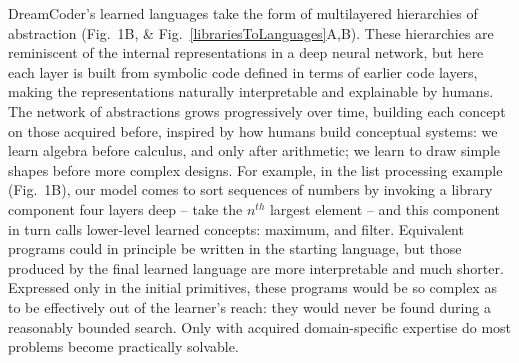 \documentclass[12pt]{article}
\begin{document}
DreamCoder's learned languages take the form of multilayered hierarchies of abstraction (Fig.~1B, \& Fig.~\ref{librariesToLanguages}A,B).  These hierarchies are reminiscent of the internal representations in a deep neural network, but here each layer is built from symbolic code defined in terms of earlier code layers, making the representations naturally interpretable and explainable by humans.  The network of abstractions grows progressively over time, building each concept on those acquired before, inspired by how humans build  conceptual systems: we learn algebra before calculus, and only after arithmetic; we learn to draw simple shapes before more complex designs. For example, in the list processing example (Fig.~1B), our model comes to sort sequences of numbers by invoking a library component four layers deep -- take the $n^{th}$ largest element -- and this component in turn calls lower-level learned concepts: maximum, and filter. Equivalent programs could in principle be written in the starting language, but those produced by the final learned language are more interpretable and much shorter. Expressed only in the initial primitives, these programs would be so complex as to be effectively out of the learner’s reach: they would never be found during a reasonably bounded search. Only with acquired domain-specific expertise do most problems become practically solvable.
\end{document}
